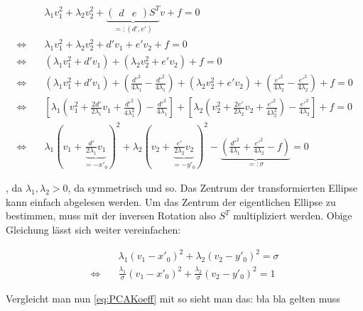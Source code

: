 \begin{equation*}
\begin{aligned}
&\lambda_1v_1^2 + \lambda_2v_2^2 + \underbrace{\begin{pmatrix}d & e\end{pmatrix}S^T}_{=:(d', e')}v + f = 0 \\
\Leftrightarrow\quad &\lambda_1v_1^2 + \lambda_2v_2^2 + d'v_1 + e'v_2 + f = 0 \\
\Leftrightarrow\quad &(\lambda_1v_1^2 + d'v_1)+ (\lambda_2v_2^2 + e'v_2) + f = 0 \\
\Leftrightarrow\quad &(\lambda_1v_1^2 + d'v_1) + (\frac{d'^2}{4\lambda_1} - \frac{d'^2}{4\lambda_1}) + (\lambda_2v_2^2 + e'v_2) + (\frac{e'^2}{4\lambda_2} - \frac{e'^2}{4\lambda_2}) + f = 0 \\
\Leftrightarrow\quad &\left[\lambda_1\left(v_1^2 + \frac{2d'}{2\lambda_1}v_1 + \frac{d'^2}{4\lambda_1^2}\right) - \frac{d'^2}{4\lambda_1}\right] +\left[\lambda_2\left(v_2^2 + \frac{2e'}{2\lambda_2}v_2 + \frac{e'^2}{4\lambda_2^2}\right) - \frac{e'^2}{4\lambda_2}\right] + f = 0 \\
\Leftrightarrow\quad &\lambda_1(v_1 + \underbrace{\frac{d'}{2\lambda_1}v_1}_{ = -x'_0})^2 +\lambda_2(v_2 + \underbrace{\frac{e'}{2\lambda_2}v_2}_{ = -y'_0})^2 - \underbrace{(\frac{d'^2}{4\lambda_1} + \frac{e'^2}{4\lambda_2} - f)}_{=:\sigma} = 0
\end{aligned}
\end{equation*}

, da $\lambda_1, \lambda_2 > 0$, da symmetrisch und so. Das Zentrum der transformierten Ellipse kann einfach abgelesen werden. Um das Zentrum der eigentlichen Ellipse zu bestimmen, muss mit der inversen Rotation also $S^T$ multipliziert werden. Obige Gleichung lässt sich weiter vereinfachen: 


\begin{equation} \label{eq:PCAKoeff}
\begin{aligned}
&\lambda_1(v_1 -x'_0)^2 +\lambda_2(v_2 -y'_0)^2 = \sigma \\
\Leftrightarrow\quad & \frac{\lambda_1}{\sigma}(v_1 -x'_0)^2 +\frac{\lambda_2}{\sigma}(v_2 -y'_0)^2  =1
\end{aligned}
\end{equation}

Vergleicht man nun \ref{eq:PCAKoeff} mit  so sieht man das:
bla bla 
gelten muss






